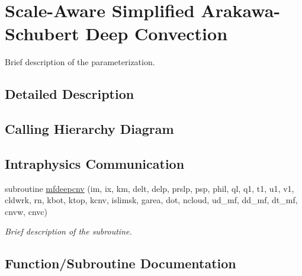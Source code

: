 \hypertarget{group___s_a_s_a_s}{}\section{Scale-\/\+Aware Simplified Arakawa-\/\+Schubert Deep Convection}
\label{group___s_a_s_a_s}


Brief description of the parameterization.  




\subsection{Detailed Description}
\hypertarget{group___g_f_s___n_s_s_t_diagram}{}\subsection{Calling Hierarchy Diagram}\label{group___g_f_s___n_s_s_t_diagram}
\hypertarget{group___g_f_s___n_s_s_t_intraphysics}{}\subsection{Intraphysics Communication}\label{group___g_f_s___n_s_s_t_intraphysics}
\begin{DoxyCompactItemize}
\item 
subroutine \hyperlink{group___s_a_s_a_s_ga7e42b11a1cdf800213df4c0d35552f75}{mfdeepcnv} (im, ix, km, delt, delp, prslp, psp, phil, ql,                                           q1, t1, u1, v1, cldwrk, rn, kbot, ktop, kcnv, islimsk, garea,                                                   dot, ncloud, ud\+\_\+mf, dd\+\_\+mf, dt\+\_\+mf, cnvw, cnvc)
\begin{DoxyCompactList}\small\item\em Brief description of the subroutine. \end{DoxyCompactList}\end{DoxyCompactItemize}


\subsection{Function/\+Subroutine Documentation}
\hypertarget{group___s_a_s_a_s_ga7e42b11a1cdf800213df4c0d35552f75}{}
